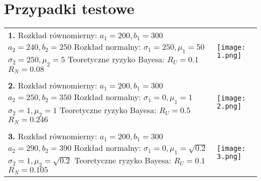 \pagebreak
\section{Przypadki testowe}
\newcommand{\specialcell}[2][c]{
  \begin{tabular}[#1]{@{}l@{}}#2\end{tabular}}
	
	\graphicspath{{C:/Users/miki/Desktop/ARO/sprawko/obrazki/}}
	
	\begin{longtable}{ p{} p{} }
	
	
	
	\specialcell{
	\textbf{1.}	\\
	Rozkład równomierny: \\ 
	$a_1 = 200, b_1 = 300$ \\
	$a_2 = 240, b_2 = 250$ \\
	Rozkład normalny: \\
	$\sigma_1 = 250, \mu_1 = 50$ \\
	$\sigma_2 = 250, \mu_2 = 5$ \\
	Teoretyczne ryzyko Bayesa: \\
	$R_U = 0.1$ \\
	$R_N = 0.08$ \\
	} & \parbox[c]{1cm}{\texttt{[image: 1.png]}}\\
	
	\\
	
	\specialcell{
	\textbf{2.}	\\
	Rozkład równomierny: \\ 
	$a_1 = 200, b_1 = 300$ \\
	$a_2 = 250, b_2 = 350$ \\
	Rozkład normalny: \\
	$\sigma_1 = 0, \mu_1 = 1$ \\
	$\sigma_2 = 1, \mu_2 = 1$ \\
	Teoretyczne ryzyko Bayesa: \\
	$R_U = 0.5$ \\
	$R_N = 0.246$ \\
	} & \parbox[c]{1cm}{\texttt{[image: 2.png]}}\\
	
	\\
	
	\specialcell{
	\textbf{3.}	\\
	Rozkład równomierny: \\ 
	$a_1 = 200, b_1 = 300$ \\
	$a_2 = 290, b_2 = 390$ \\
	Rozkład normalny: \\
	$\sigma_1 = 0, \mu_1 = \sqrt{0.2}$ \\
	$\sigma_2 = 1, \mu_2 = \sqrt{0.2}$ \\
	Teoretyczne ryzyko Bayesa: \\
	$R_U = 0.1$ \\
	$R_N = 0.105$ \\
	} & \parbox[c]{1cm}{\texttt{[image: 3.png]}}\\
	

\end{longtable}

